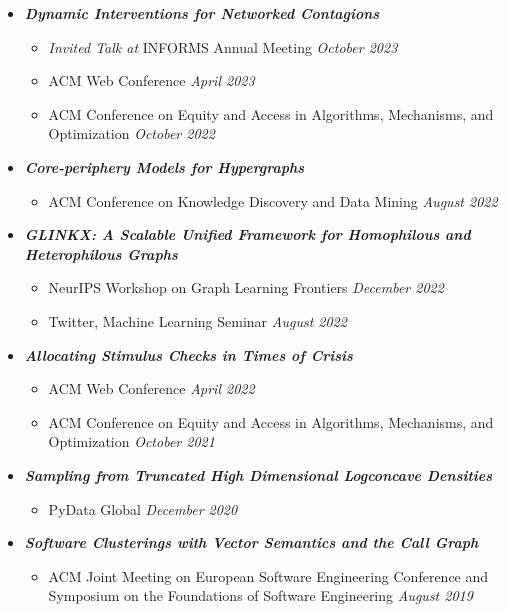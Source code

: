 \documentclass[margin]{res}
\newcommand{\bemph}[1]{\textbf{\emph{#1}}}
\begin{document}
\begin{resume}
\begin{itemize}[nosep]
	\item \bemph{Dynamic Interventions for Networked Contagions}
	\begin{itemize}[nosep]
		\item \emph{Invited Talk at} INFORMS Annual Meeting \hfill \emph{October 2023}
		\item ACM Web Conference \hfill \emph{April 2023}	
		\item ACM Conference on Equity and Access in Algorithms, Mechanisms, and Optimization \hfill \emph{October 2022}
	\end{itemize}

	\item \bemph{Core-periphery Models for Hypergraphs}
	\begin{itemize}[nosep]
		\item ACM Conference on Knowledge Discovery and Data Mining \hfill \emph{August 2022}
	\end{itemize}
	
	\item \bemph{GLINKX: A Scalable Unified Framework for Homophilous and Hetero\-philous Graphs}
	\begin{itemize}[nosep]
		\item NeurIPS Workshop on Graph Learning Frontiers  \hfill \emph{December 2022}
		\item Twitter, Machine Learning Seminar \hfill \emph{August 2022}
		
	\end{itemize}

 
	\item \bemph{Allocating Stimulus Checks in Times of Crisis} 
	\begin{itemize}[nosep]
		\item ACM Web Conference \hfill \emph{April 2022}
		\item ACM Conference on Equity and Access in Algorithms, Mechanisms, and Optimization \hfill \emph{October 2021}
	\end{itemize}

	\item \bemph{Sampling from Truncated High Dimensional Logconcave Densities}
	\begin{itemize}[nosep]
		\item PyData Global \hfill \emph{December 2020}
	\end{itemize}
	
	\item \bemph{Software Clusterings with Vector Semantics and the Call Graph}
	\begin{itemize}[nosep]
		\item ACM Joint Meeting on European Software Engineering Conference and Symposium on the Foundations of Software Engineering \hfill \emph{August 2019}
	\end{itemize} 
	

\end{itemize}
\end{resume}
\end{document}
